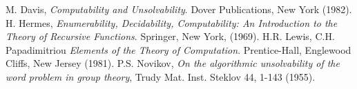 \documentclass[12pt]{article}
\begin{document}
\begin{thebibliography}{9}
 M. Davis, {\em Computability and Unsolvability}. Dover Publications, New York (1982).
 H. Hermes, {\em Enumerability, Decidability, Computability: An Introduction to the Theory of Recursive Functions}. Springer, New York, (1969).
 H.R. Lewis, C.H. Papadimitriou {\em Elements of the Theory of Computation}. Prentice-Hall, Englewood Cliffs, New Jersey (1981).
 P.S. Novikov, {\em On the algorithmic unsolvability of the word problem in group theory},
Trudy Mat. Inst. Steklov 44, 1-143 (1955).
\end{thebibliography}
\end{document}
